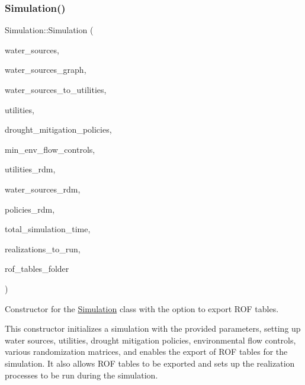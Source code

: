\subsubsection{\texorpdfstring{Simulation()}{Simulation()}\hspace{0.1cm}{\footnotesize\ttfamily [3/3]}}
{\footnotesize\ttfamily Simulation\+::\+Simulation (\begin{DoxyParamCaption}\item[{vector$<$ \mbox{\hyperlink{classWaterSource}{Water\+Source}} $\ast$$>$ \&}]{water\+\_\+sources,  }\item[{Graph \&}]{water\+\_\+sources\+\_\+graph,  }\item[{const vector$<$ vector$<$ int $>$$>$ \&}]{water\+\_\+sources\+\_\+to\+\_\+utilities,  }\item[{vector$<$ \mbox{\hyperlink{classUtility}{Utility}} $\ast$$>$ \&}]{utilities,  }\item[{const vector$<$ Drought\+Mitigation\+Policy $\ast$$>$ \&}]{drought\+\_\+mitigation\+\_\+policies,  }\item[{vector$<$ Min\+Env\+Flow\+Control $\ast$$>$ \&}]{min\+\_\+env\+\_\+flow\+\_\+controls,  }\item[{vector$<$ vector$<$ double $>$$>$ \&}]{utilities\+\_\+rdm,  }\item[{vector$<$ vector$<$ double $>$$>$ \&}]{water\+\_\+sources\+\_\+rdm,  }\item[{vector$<$ vector$<$ double $>$$>$ \&}]{policies\+\_\+rdm,  }\item[{const unsigned long}]{total\+\_\+simulation\+\_\+time,  }\item[{vector$<$ unsigned long $>$ \&}]{realizations\+\_\+to\+\_\+run,  }\item[{string \&}]{rof\+\_\+tables\+\_\+folder }\end{DoxyParamCaption})}



Constructor for the \mbox{\hyperlink{classSimulation}{Simulation}} class with the option to export R\+OF tables. 

This constructor initializes a simulation with the provided parameters, setting up water sources, utilities, drought mitigation policies, environmental flow controls, various randomization matrices, and enables the export of R\+OF tables for the simulation. It also allows R\+OF tables to be exported and sets up the realization processes to be run during the simulation.


